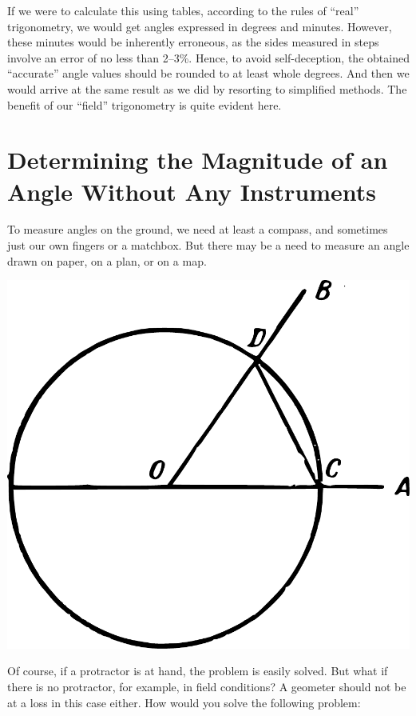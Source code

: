 If we were to calculate this using tables, according to the rules of ``real'' trigonometry, we would get angles expressed in degrees and minutes. However, these minutes would be inherently erroneous, as the sides measured in steps involve an error of no less than 2–3\%. Hence, to avoid self-deception, the obtained ``accurate'' angle values should be rounded to at least whole degrees. And then we would arrive at the same result as we did by resorting to simplified methods. The benefit of our ``field'' trigonometry is quite evident here.


\section{Determining the Magnitude of an Angle Without Any Instruments}

To measure angles on the ground, we need at least a compass, and sometimes just our own fingers or a matchbox. But there may be a need to measure an angle drawn on paper, on a plan, or on a map.

\begin{marginfigure}%
\centering
\includegraphics[width=\textwidth]{figures/ch-05/fig-097.pdf}
\end{marginfigure}

Of course, if a protractor is at hand, the problem is easily solved. But what if there is no protractor, for example, in field conditions? A geometer should not be at a loss in this case either. How would you solve the following problem: 

